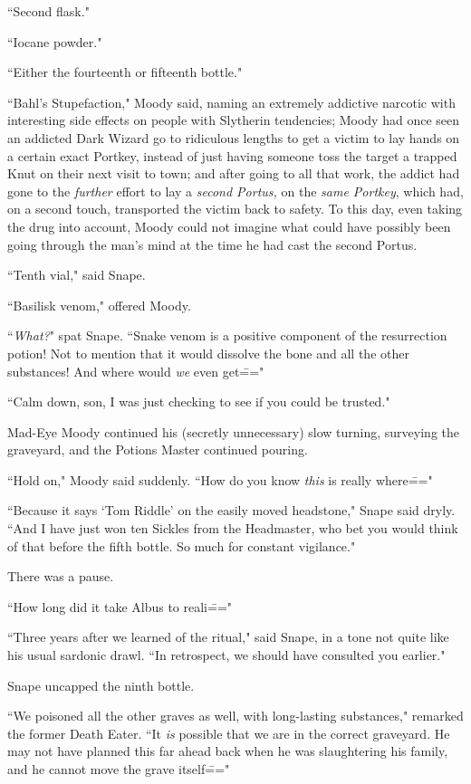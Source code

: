 ``Second flask."

``Iocane powder."

``Either the fourteenth or fifteenth bottle."

``Bahl's Stupefaction," Moody said, naming an extremely addictive narcotic with interesting side effects on people with Slytherin tendencies; Moody had once seen an addicted Dark Wizard go to ridiculous lengths to get a victim to lay hands on a certain exact Portkey, instead of just having someone toss the target a trapped Knut on their next visit to town; and after going to all that work, the addict had gone to the \emph{further} effort to lay a \emph{second Portus,} on the \emph{same Portkey}, which had, on a second touch, transported the victim back to safety. To this day, even taking the drug into account, Moody could not imagine what could have possibly been going through the man's mind at the time he had cast the second Portus.

``Tenth vial," said Snape.

``Basilisk venom," offered Moody.

``\emph{What?}" spat Snape. ``Snake venom is a positive component of the resurrection potion! Not to mention that it would dissolve the bone and all the other substances! And where would \emph{we} even get\==="

``Calm down, son, I was just checking to see if you could be trusted."

Mad-Eye Moody continued his (secretly unnecessary) slow turning, surveying the graveyard, and the Potions Master continued pouring.

``Hold on," Moody said suddenly. ``How do you know \emph{this} is really where\==="

``Because it says `Tom Riddle' on the easily moved headstone," Snape said dryly. ``And I have just won ten Sickles from the Headmaster, who bet you would think of that before the fifth bottle. So much for constant vigilance."

There was a pause.

``How long did it take Albus to reali\==="

``Three years after we learned of the ritual," said Snape, in a tone not quite like his usual sardonic drawl. ``In retrospect, we should have consulted you earlier."

Snape uncapped the ninth bottle.

``We poisoned all the other graves as well, with long-lasting substances," remarked the former Death Eater. ``It \emph{is} possible that we are in the correct graveyard. He may not have planned this far ahead back when he was slaughtering his family, and he cannot move the grave itself\==="

